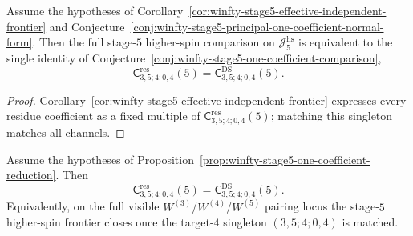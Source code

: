 \begin{proposition}
\label{prop:winfty-stage5-one-coefficient-reduction}
Assume the hypotheses of
Corollary~\ref{cor:winfty-stage5-effective-independent-frontier} and
Conjecture~\ref{conj:winfty-stage5-principal-one-coefficient-normal-form}.
Then the full stage-$5$ higher-spin comparison on
\(\mathcal{J}_5^{\mathrm{hs}}\) is equivalent to the single identity of
Conjecture~\ref{conj:winfty-stage5-one-coefficient-comparison},
\[
\mathsf{C}^{\mathrm{res}}_{3,5;4;0,4}(5)
=
\mathsf{C}^{\mathrm{DS}}_{3,5;4;0,4}(5).
\]
\end{proposition}

\begin{proof}
Corollary~\ref{cor:winfty-stage5-effective-independent-frontier} expresses every residue coefficient as a fixed multiple of \(\mathsf{C}^{\mathrm{res}}_{3,5;4;0,4}(5)\); matching this singleton matches all channels.
\end{proof}

\begin{conjecture}
\label{conj:winfty-stage5-one-coefficient-comparison}
\ClaimStatusConjectured{}
Assume the hypotheses of
Proposition~\ref{prop:winfty-stage5-one-coefficient-reduction}.  Then
\[
\mathsf{C}^{\mathrm{res}}_{3,5;4;0,4}(5)
=
\mathsf{C}^{\mathrm{DS}}_{3,5;4;0,4}(5).
\]
Equivalently, on the full visible
\texorpdfstring{$W^{(3)}$}{W3}/\texorpdfstring{$W^{(4)}$}{W4}/\texorpdfstring{$W^{(5)}$}{W5}
pairing locus the stage-$5$ higher-spin frontier closes once the
target-$4$ singleton \((3,5;4;0,4)\) is matched.
\end{conjecture}


